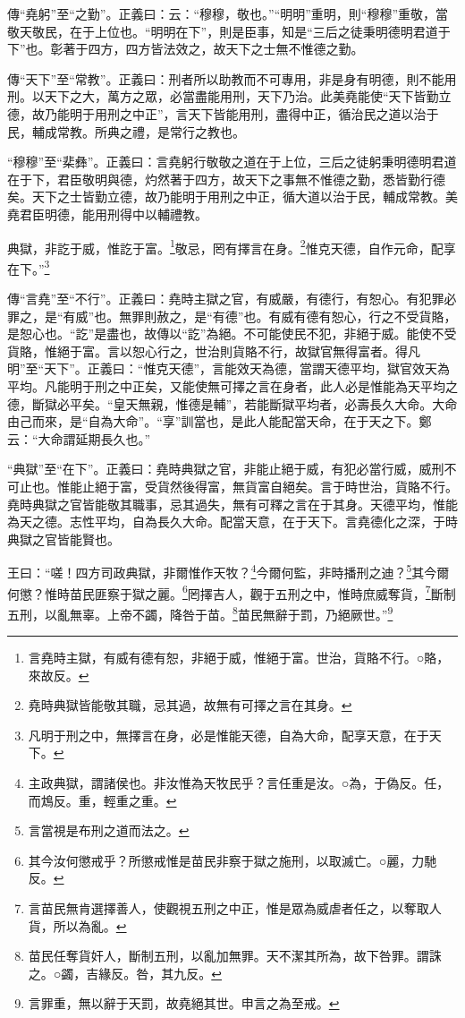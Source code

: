 {\noindent\zhuan{}\fzbyks 傳“堯躬”至“之勤”。正義曰：云：“穆穆，敬也。”“明明”重明，則“穆穆”重敬，當敬天敬民，在于上位也。“明明在下”，則是臣事，知是“三后之徒秉明德明君道于下”也。彰著于四方，四方皆法效之，故天下之士無不惟德之勤。 \par}

{\noindent\zhuan{}\fzbyks 傳“天下”至“常教”。正義曰：刑者所以助教而不可專用，非是身有明德，則不能用刑。以天下之大，萬方之眾，必當盡能用刑，天下乃治。此美堯能使“天下皆勤立德，故乃能明于用刑之中正”，言天下皆能用刑，盡得中正，循治民之道以治于民，輔成常教。所典之禮，是常行之教也。 \par}

{\noindent\shu{}\fzkt “穆穆”至“棐彝”。正義曰：言堯躬行敬敬之道在于上位，三后之徒躬秉明德明君道在于下，君臣敬明與德，灼然著于四方，故天下之事無不惟德之勤，悉皆勤行德矣。天下之士皆勤立德，故乃能明于用刑之中正，循大道以治于民，輔成常教。美堯君臣明德，能用刑得中以輔禮教。 \par}

典獄，非訖于威，惟訖于富。\footnote{言堯時主獄，有威有德有恕，非絕于威，惟絕于富。世治，貨賂不行。○賂，來故反。}敬忌，罔有擇言在身。\footnote{堯時典獄皆能敬其職，忌其過，故無有可擇之言在其身。}惟克天德，自作元命，配享在下。”\footnote{凡明于刑之中，無擇言在身，必是惟能天德，自為大命，配享天意，在于天下。}


{\noindent\zhuan{}\fzbyks 傳“言堯”至“不行”。正義曰：堯時主獄之官，有威嚴，有德行，有恕心。有犯罪必罪之，是“有威”也。無罪則赦之，是“有德”也。有威有德有恕心，行之不受貨賂，是恕心也。“訖”是盡也，故傳以“訖”為絕。不可能使民不犯，非絕于威。能使不受貨賂，惟絕于富。言以恕心行之，世治則貨賂不行，故獄官無得富者。得凡明”至“天下”。正義曰：“惟克天德”，言能效天為德，當謂天德平均，獄官效天為平均。凡能明于刑之中正矣，又能使無可擇之言在身者，此人必是惟能為天平均之德，斷獄必平矣。“皇天無親，惟德是輔”，若能斷獄平均者，必壽長久大命。大命由己而來，是“自為大命”。“享”訓當也，是此人能配當天命，在于天之下。鄭云：“大命謂延期長久也。” \par}

{\noindent\shu{}\fzkt “典獄”至“在下”。正義曰：堯時典獄之官，非能止絕于威，有犯必當行威，威刑不可止也。惟能止絕于富，受貨然後得富，無貨富自絕矣。言于時世治，貨賂不行。堯時典獄之官皆能敬其職事，忌其過失，無有可釋之言在于其身。天德平均，惟能為天之德。志性平均，自為長久大命。配當天意，在于天下。言堯德化之深，于時典獄之官皆能賢也。 \par}

王曰：“嗟！四方司政典獄，非爾惟作天牧？\footnote{主政典獄，謂諸侯也。非汝惟為天牧民乎？言任重是汝。○為，于偽反。任，而鴆反。重，輕重之重。}今爾何監，非時播刑之迪？\footnote{言當視是布刑之道而法之。}其今爾何懲？惟時苗民匪察于獄之麗。\footnote{其今汝何懲戒乎？所懲戒惟是苗民非察于獄之施刑，以取滅亡。○麗，力馳反。}罔擇吉人，觀于五刑之中，惟時庶威奪貨，\footnote{言苗民無肯選擇善人，使觀視五刑之中正，惟是眾為威虐者任之，以奪取人貨，所以為亂。}斷制五刑，以亂無辜。上帝不蠲，降咎于苗。\footnote{苗民任奪貨奸人，斷制五刑，以亂加無罪。天不潔其所為，故下咎罪。謂誅之。○蠲，吉緣反。咎，其九反。}苗民無辭于罰，乃絕厥世。”\footnote{言罪重，無以辭于天罰，故堯絕其世。申言之為至戒。}


